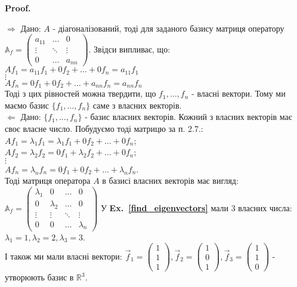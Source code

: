 \documentclass[a4paper, 10pt]{article}
\makeatletter
\def\rightproof{$\boxed{\Rightarrow}$ }
\def\leftproof{$\boxed{\Leftarrow}$ }
\theoremstyle{theoremdd}
\newcommand\exref[1]{\textbf{Ex.~\ref{#1}}}
\renewenvironment{proof}[1][Proof.\\]{\par
\pushQED{\hfill \qed}%
\normalfont \topsep6\p@\@plus6\p@\relax
\trivlist
\item\relax
{\bfseries
#1\@addpunct{.}}\hspace\labelsep\ignorespaces
}{%
\popQED\endtrivlist\@endpefalse
}
\makeatother
\begin{document}
\begin{proof}
\rightproof Дано: $A$ - діагоналізований, тоді для заданого базису матриця оператору $\mathbb{A}_f = \begin{pmatrix}
a_{11} & \dots & 0 \\
\vdots & \ddots & \vdots \\
0 & \dots & a_{nn}
\end{pmatrix}$. Звідси випливає, що:\\
$Af_1 = a_{11}f_1 + 0f_2 + \dots + 0f_n = a_{11}f_1$\\
$\vdots$\\
$Af_n = 0f_1 + 0f_2 + \dots + a_{nn}f_n = a_{nn}f_n$\\
Тоді з цих рівностей можна твердити, що $f_1,\dots,f_n$ - власні вектори. Тому ми маємо базис $\{f_1,\dots,f_n\}$ саме з власних векторів.
\bigskip \\
\leftproof Дано: $\{f_1,\dots,f_n\}$ - базис власних векторів. Кожний з власних векторів має своє власне число. Побудуємо тоді матрицю за п. 2.7.:\\
$Af_1 = \lambda_1 f_1 = \lambda_1 f_1 + 0 f_2 + \dots + 0 f_n$;\\
$Af_2 = \lambda_2 f_2 = 0 f_1 + \lambda_2 f_2 + \dots + 0 f_n$;\\
$\vdots$\\
$Af_n = \lambda_n f_n = 0 f_1 + 0 f_2 + \dots + \lambda_n f_n$.\\
Тоді матриця оператора $A$ в базисі власних векторів має вигляд:\\
$\mathbb{A}_f = \begin{pmatrix}
\lambda_1 & 0 & \dots & 0 \\
0 & \lambda_2 & \dots & 0 \\
\vdots & \vdots & \ddots & \vdots \\
0 & 0 & \dots & \lambda_n
\end{pmatrix}$
\end{proof}
\noindent
У \exref{find_eigenvectors} мали 3 власних числа: $\lambda_1 = 1, \lambda_2 = 2,\lambda_3 = 3$.\\
І також ми мали власні вектори: $\vec{f}_1 = \begin{pmatrix}
1 \\ 1 \\ 1
\end{pmatrix}, \vec{f}_2 = \begin{pmatrix}
1 \\ 0 \\ 1
\end{pmatrix}, \vec{f}_3 = \begin{pmatrix}
1 \\ 1 \\ 0
\end{pmatrix}$ - утворюють базис в $\mathbb{R}^3$.\\
\end{document}
